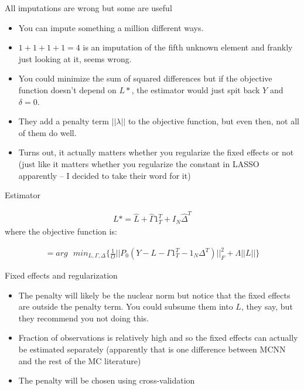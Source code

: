 \documentclass{beamer}
\begin{document}
\begin{frame}{All imputations are wrong but some are useful}	
	
\begin{itemize}
\item You can impute something a million different ways.  
\item $1+1+1+1 = 4$ is an imputation of the fifth unknown element and frankly just looking at it, seems wrong.
\item You could minimize the sum of squared differences but if the objective function doesn't depend on $L*$, the estimator would just spit back $Y$ and $\delta=0$. 
\item They add a penalty term $||\lambda||$ to the objective function, but even then, not all of them do well. 
\item Turns out, it actually matters whether you regularize the fixed effects or not (just like it matters whether you regularize the constant in LASSO apparently -- I decided to take their word for it)
\end{itemize}

\end{frame}

\begin{frame}{Estimator}

\begin{eqnarray*}
L* = \widehat{L} + \widehat{\Gamma}1_T^T + I_N\widehat{\Delta}^T
\end{eqnarray*}where the objective function is:

\begin{eqnarray*}
= arg\text{ }min_{L,\Gamma,\Delta} \bigg \{ \frac{1}{O} || P_0(Y-L-\Gamma 1_T^T - 1_N\Delta^T)||_F^2 + \Lambda||L|| \bigg \}
\end{eqnarray*}

\end{frame}

\begin{frame}{Fixed effects and regularization}

\begin{itemize}
\item The penalty will likely be the nuclear norm but notice that the fixed effects are outside the penalty term.  You could subsume them into $L$, they say, but they recommend you not doing this.
\item Fraction of observations is relatively high and so the fixed effects can actually be estimated separately (apparently that is one difference between MCNN and the rest of the MC literature)
\item The penalty will be chosen using cross-validation
\end{itemize}

\end{frame}
\end{document}
